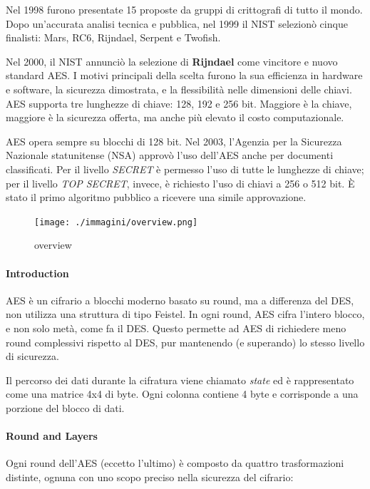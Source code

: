 \documentclass{report}
\begin{document}
Nel 1998 furono presentate 15 proposte da gruppi di crittografi di tutto il mondo. Dopo un'accurata analisi tecnica e pubblica, nel 1999 il NIST selezionò cinque finalisti: Mars, RC6, Rijndael, Serpent e Twofish.

Nel 2000, il NIST annunciò la selezione di \textbf{Rijndael} come vincitore e nuovo standard AES. I motivi principali della scelta furono la sua efficienza in hardware e software, la sicurezza dimostrata, e la flessibilità nelle dimensioni delle chiavi. AES supporta tre lunghezze di chiave: 128, 192 e 256 bit. Maggiore è la chiave, maggiore è la sicurezza offerta, ma anche più elevato il costo computazionale.

AES opera sempre su blocchi di 128 bit. Nel 2003, l'Agenzia per la Sicurezza Nazionale statunitense (NSA) approvò l’uso dell’AES anche per documenti classificati. Per il livello \textit{SECRET} è permesso l’uso di tutte le lunghezze di chiave; per il livello \textit{TOP SECRET}, invece, è richiesto l’uso di chiavi a 256 o 512 bit. È stato il primo algoritmo pubblico a ricevere una simile approvazione.

\begin{figure}[h]
\centering
\texttt{[image: ./immagini/overview.png]}
\caption{overview}
\end{figure}

\paragraph{Introduction}

AES è un cifrario a blocchi moderno basato su round, ma a differenza del DES, non utilizza una struttura di tipo Feistel. In ogni round, AES cifra l'intero blocco, e non solo metà, come fa il DES. Questo permette ad AES di richiedere meno round complessivi rispetto al DES, pur mantenendo (e superando) lo stesso livello di sicurezza.

Il percorso dei dati durante la cifratura viene chiamato \textit{state} ed è rappresentato come una matrice 4x4 di byte. Ogni colonna contiene 4 byte e corrisponde a una porzione del blocco di dati.

\paragraph{Round and Layers}

Ogni round dell’AES (eccetto l’ultimo) è composto da quattro trasformazioni distinte, ognuna con uno scopo preciso nella sicurezza del cifrario:
\end{document}

